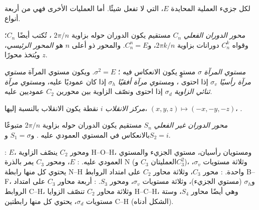 لكل جزيء العملية المحايدة $E$، التي لا تفعل شيئًا. أما
العمليات الأخرى فهي من أربعة أنواع.

\begin{definition}\label{def:b3:point-groups:rotation}
\emph{محور الدوران الفعلي} $C_n$ مستقيم
يكون الدوران حوله بزاوية $2\pi/n$ ، تُكتب أيضًا
$C_n$؛ وقواه $C_n^k$ دورانات بزاوية $2\pi k/n$، و$C_n^n = E$. 
والمحور ذو أعلى $n$ هو \emph{المحور الرئيسي}، ويُتخذ
محورًا $z$.
\end{definition}

\begin{definition}\label{def:b3:point-groups:mirror}
\emph{مستوي المرآة} $\sigma$ مستوٍ يكون
الانعكاس فيه ؛ $\sigma^2 = E$. ويكون مستوي المرآة
\emph{مستوي مرآة رأسيًا} $\sigma_v$ إذا
احتوى ، و\emph{مستوي مرآة
أفقيًا} $\sigma_h$ إذا كان عموديًا
عليه، و\emph{مستوي مرآة ثنائي الزاوية}
$\sigma_d$ إذا احتوى  ونصّف الزاوية بين
محورين $C_2$ عموديين عليه.
\end{definition}

\begin{definition}\label{def:b3:point-groups:inversion}
\emph{مركز الانقلاب} $i$ نقطة يكون
الانقلاب بالنسبة إليها، $(x, y, z) \mapsto (-x, -y, -z)$، .
\end{definition}

\begin{definition}\label{def:b3:point-groups:improper}
\emph{محور الدوران غير الفعلي} $S_n$
مستقيم يكون الدوران حوله بزاوية $2\pi/n$ متبوعًا بالانعكاس في المستوي
العمودي عليه . و$S_1 = \sigma$ و$S_2 = i$.
\end{definition}

\begin{example}\label{ex:b3:point-groups:elements}
: $E$، ومحور $C_2$ ينصّف الزاوية H--O--H، ومستويان
رأسيان، مستوي الجزيء والمستوي العمودي عليه. :
$E$، ومحور $C_3$ يمر بالذرة N (العمليتان $C_3$ و$C_3^2$)، وثلاثة مستويات $\sigma_v$، يحتوي كل منها
رابطة N--H واحدة. : محور $C_3$، وثلاثة محاور $C_2$ على امتداد الروابط B--F،
و$\sigma_h$ (مستوي الجزيء)، وثلاثة مستويات $\sigma_v$، ومحور $S_3$. : أربعة محاور
$C_3$ على امتداد الروابط C--H، وثلاثة محاور $C_2$ تنصّف الزوايا H--C--H، وهي
أيضًا محاور $S_4$، وستة مستويات $\sigma_d$، يحتوي كل منها رابطتين C--H
(الشكل أدناه).
\end{example}

